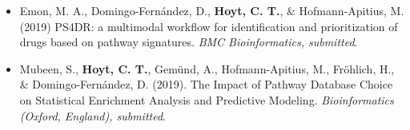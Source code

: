 \begin{itemize}
    \item Emon, M. A., Domingo-Fern\'{a}ndez, D., \textbf{Hoyt, C. T.}, \& Hofmann-Apitius, M. (2019) PS4DR: a multimodal workflow for identification and prioritization of drugs based on pathway signatures. \textit{BMC Bioinformatics, submitted}.
    \item Mubeen, S., \textbf{Hoyt, C. T.}, Gem\"{u}nd, A., Hofmann-Apitius, M., Fr\"{o}hlich, H., \& Domingo-Fern\'{a}ndez, D. (2019). The Impact of Pathway Database Choice on Statistical Enrichment Analysis and Predictive Modeling. \textit{Bioinformatics (Oxford, England), submitted}.
\end{itemize}